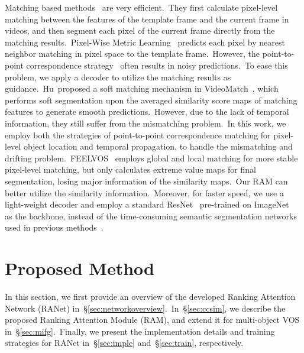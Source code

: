 \documentclass[10pt,twocolumn,letterpaper]{article}
\begin{document}
Matching based methods~\cite{videomatch, pml, plm, Voigtlaender2019FEELVOS} are very efficient.\ They first calculate pixel-level matching between the features of the template frame and the current frame in videos, and then segment each pixel of the current frame directly from the matching results.\ Pixel-Wise Metric Learning~\cite{pml} predicts each pixel by nearest neighbor matching in pixel space to the template frame.\ However, the point-to-point correspondence strategy~\cite{deepmatching, plm} often results in noisy predictions.\ To ease this problem, we apply a decoder to utilize the matching results as guidance.\ Hu~\etal proposed a soft matching mechanism in VideoMatch~\cite{videomatch}, which performs soft segmentation upon the averaged similarity score maps of matching features to generate smooth predictions.\ However, due to the lack of temporal information, they still suffer from the mismatching problem.\ In this work, we employ both the strategies of point-to-point correspondence matching for pixel-level object location and temporal propagation, to handle the mismatching and drifting problem.\ 
FEELVOS~\cite{Voigtlaender2019FEELVOS} employs global and local matching for more stable pixel-level matching, but only calculates extreme value maps for final segmentation, losing major information of the similarity maps.\ Our RAM can better utilize the similarity information.\ Moreover, for faster speed, we use a light-weight decoder and employ a standard ResNet~\cite{resnet} pre-trained on ImageNet~\cite{imagenet} as the backbone, instead of the time-consuming semantic segmentation networks~\cite{deeplab, deeplabv3, deeplabv3+, YazhaoSegICCV2019} used in previous methods~\cite{videomatch, masktrack}.











\section{Proposed Method}
\label{sec:method}
In this section, we first provide an overview of the developed Ranking Attention Network (RANet) in~\S\ref{sec:networkoverview}.\ In~\S\ref{sec:ccsim}, we describe the proposed Ranking Attention Module (RAM), and extend it for multi-object VOS in~\S\ref{sec:mifg}.\ Finally, we present the implementation details and training strategies for RANet in~\S\ref{sec:imple} and~\S\ref{sec:train}, respectively.
\end{document}
